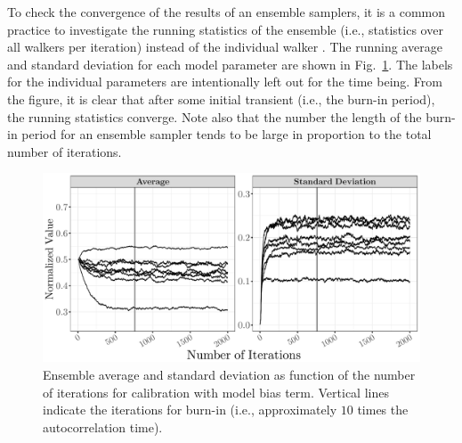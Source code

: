To check the convergence of the results of an ensemble samplers, it is a common practice to investigate the running statistics of the ensemble (i.e., statistics over all walkers per iteration) instead of the individual walker \cite{Foreman-Mackey2013,Akeret2013}.
The running average and standard deviation for each model parameter are shown in Fig.~\ref{fig:ch5_plot_ens_stat_mcmc}.
The labels for the individual parameters are intentionally left out for the time being.
From the figure, it is clear that after some initial transient (i.e., the burn-in period), the running statistics converge.
Note also that the number the length of the burn-in period for an ensemble sampler tends to be large in proportion to the total number of iterations.
\begin{figure}[!bth]
    \centering
    \includegraphics[width=1.0\textwidth]{../figures/chapter5/figures/plotEnsStatMCMC}
    \caption[Ensemble average and standard deviation as function of the number of iterations for calibration with model bias term.]{Ensemble average and standard deviation as function of the number of iterations for calibration with model bias term. Vertical lines indicate the iterations for burn-in (i.e., approximately $10$ times the autocorrelation time).}
    \label{fig:ch5_plot_ens_stat_mcmc}
\end{figure}

